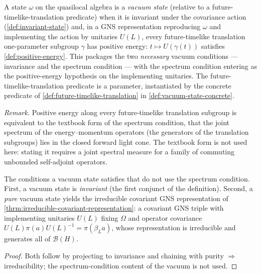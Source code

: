 \begin{definition}
    \label{def:vacuum-state}
    \leanok
    A state $\omega$ on the quasilocal algebra is a \emph{vacuum state} (relative to a future-timelike-translation predicate) when it is invariant under the covariance action (\ref{def:invariant-state}) and, in a GNS representation reproducing $\omega$ and implementing the action by unitaries $U(L)$, every future-timelike translation one-parameter subgroup $\gamma$ has positive energy: $t \mapsto U(\gamma(t))$ satisfies \ref{def:positive-energy}. This packages the two \emph{necessary} vacuum conditions --- invariance and the spectrum condition --- with the spectrum condition entering as the positive-energy hypothesis on the implementing unitaries. The future-timelike-translation predicate is a parameter, instantiated by the concrete predicate of \ref{def:future-timelike-translation} in \ref{def:vacuum-state-concrete}.

    \emph{Remark.} Positive energy along every future-timelike translation subgroup is equivalent to the textbook form of the spectrum condition, that the joint spectrum of the energy--momentum operators (the generators of the translation subgroups) lies in the closed forward light cone. The textbook form is not used here: stating it requires a joint spectral measure for a family of commuting unbounded self-adjoint operators.
\end{definition}

\begin{theorem}
    \label{thrm:vacuum-invariance-consequences}
    \leanok
    The conditions a vacuum state satisfies that do not use the spectrum condition. First, a vacuum state is \emph{invariant} (the first conjunct of the definition). Second, a \emph{pure} vacuum state yields the irreducible covariant GNS representation of \ref{thrm:irreducible-covariant-representation}: a covariant GNS triple with implementing unitaries $U(L)$ fixing $\Omega$ and operator covariance $U(L)\pi(a)U(L)^{-1} = \pi(\beta_L a)$, whose representation is irreducible and generates all of $\mathcal{B}(H)$.
\end{theorem}
\begin{proof}
    \leanok
    Both follow by projecting to invariance and chaining with purity $\Rightarrow$ irreducibility; the spectrum-condition content of the vacuum is not used.
\end{proof}


